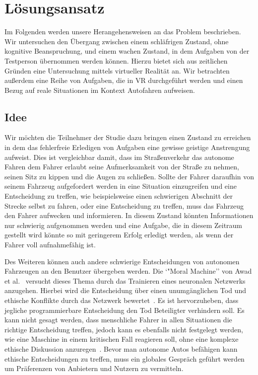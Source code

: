 \chapter{Lösungsansatz}\label{cha:approach}

Im Folgenden werden unsere Herangehensweisen an das Problem beschrieben. Wir untersuchen den Übergang zwischen einem schläfrigen Zustand, ohne kognitive Beanspruchung, und einem wachen Zustand, in dem Aufgaben von der Testperson übernommen werden können. Hierzu bietet sich aus zeitlichen Gründen eine Untersuchung mittels virtueller Realität an. Wir betrachten außerdem eine Reihe von Aufgaben, die in VR durchgeführt werden und einen Bezug auf reale Situationen im Kontext Autofahren aufweisen.

\section{Idee}

Wir möchten die Teilnehmer der Studie dazu bringen einen Zustand zu erreichen in dem das fehlerfreie Erledigen von Aufgaben eine gewisse geistige Anstrengung aufweist. Dies ist vergleichbar damit, dass im Straßenverkehr das autonome Fahren dem Fahrer erlaubt seine Aufmerksamkeit von der Straße zu nehmen, seinen Sitz zu kippen und die Augen zu schließen. Sollte der Fahrer daraufhin von seinem Fahrzeug aufgefordert werden in eine Situation einzugreifen und eine Entscheidung zu treffen, wie beispielsweise einen schwierigen Abschnitt der Strecke selbst zu fahren, oder eine Entscheidung zu treffen, muss das Fahrzeug den Fahrer aufwecken und informieren. In diesem Zustand könnten Informationen nur schwierig aufgenommen werden und eine Aufgabe, die in diesem Zeitraum gestellt wird könnte so mit geringerem Erfolg erledigt werden, als wenn der Fahrer voll aufnahmefähig ist.

Des Weiteren können auch andere schwierige Entscheidungen von autonomen Fahrzeugen an den Benutzer übergeben werden. Die `"Moral Machine'' von Awad et al.~\cite{awad2018moral} versucht dieses Thema durch das Trainieren eines neuronalen Netzwerks anzugehen. Hierbei wird die Entscheidung über einen unumgänglichen Tod und ethische Konflikte durch das Netzwerk bewertet~\cite{awad2018moral}. Es ist hervorzuheben, dass jegliche programmierbare Entscheidung den Tod Beteiligter verhindern soll. 
Es kann nicht gesagt werden, dass menschliche Fahrer in allen Situationen die richtige Entscheidung treffen, jedoch kann es ebenfalls nicht festgelegt werden, wie eine Maschine in einem kritischen Fall reagieren soll, ohne eine komplexe ethische Diskussion anzuregen~\cite{awad2018moral}.
Bevor man autonome Autos befähigen kann ethische Entscheidungen zu treffen, muss ein globales Gespräch geführt werden um Präferenzen von Anbietern und Nutzern zu vermitteln.

